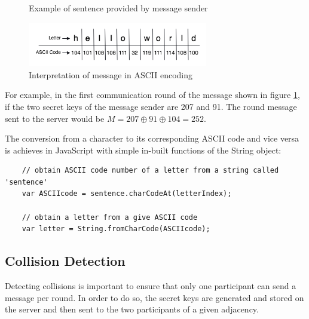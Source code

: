 \begin{figure}[H]
    \centering
    \caption{Example of sentence provided by message sender }
    \label{fig:exampleMessage}
\end{figure}


\begin{figure}[H]
    \centering
    \includegraphics[width=0.70\textwidth]{Images/Implementation/messageInASCII.png}
    \caption{Interpretation of message in ASCII encoding}
    \label{fig:exampleInASCII}
\end{figure}

For example, in the first communication round of the message shown in figure \ref{fig:exampleMessage}, if the two secret keys of the message sender are 207 and 91. The round message sent to the server would be $M = 207 \oplus 91 \oplus 104 = 252$.

The conversion from a character to its corresponding ASCII code and vice versa is achieves in JavaScript with simple in-built functions of the String object: 
\begin{lstlisting}
    // obtain ASCII code number of a letter from a string called 'sentence'
    var ASCIIcode = sentence.charCodeAt(letterIndex);

    // obtain a letter from a give ASCII code
    var letter = String.fromCharCode(ASCIIcode);
\end{lstlisting}



\subsection{Collision Detection}
Detecting collisions is important to ensure that only one participant can send a message per round. In order to do so, the secret keys are generated and stored on the server and then sent to the two participants of a given adjacency. 

